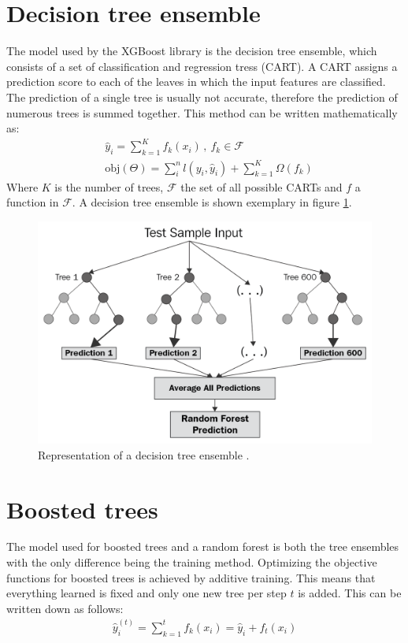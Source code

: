 \section{Decision tree ensemble}
The model used by the XGBoost library is the decision tree ensemble, which consists of a set of classification and regression tress (CART).
A CART assigns a prediction score to each of the leaves in which the input features are classified. The prediction of a single tree is usually not accurate,
therefore the prediction of numerous trees is summed together. This method can be written mathematically as:
\begin{align}
  &\hat{y}_i = \sum_{k=1}^K f_k(x_i)\,, \: f_k \in \mathcal{F} \\
  &\text{obj}(\Theta) = \sum_i^n l(y_i, \hat{y}_i) + \sum_{k=1}^K \Omega(f_k)
\end{align}
Where $K$ is the number of trees, $\mathcal{F}$ the set of all possible CARTs and $f$ a function in $\mathcal{F}$. A decision tree ensemble is shown exemplary in
figure \ref{fig:random_forest}.

\begin{figure}
  \centering
  \includegraphics[height=0.6\textwidth]{images/random_forest.png}
  \caption{Representation of a decision tree ensemble \cite{random_forest}.}
  \label{fig:random_forest}
\end{figure}

\section{Boosted trees}
The model used for boosted trees and a random forest is both the tree ensembles with the only difference being the training method. Optimizing the objective functions for
boosted trees is achieved by additive training. This means that everything learned is fixed and only one new tree per step $t$ is added. This can be written
down as follows:
\begin{align}
  \hat{y}_i^{(t)} = \sum_{k=1}^t f_k(x_i) = \hat{y}_i + f_t(x_i)
\end{align}

